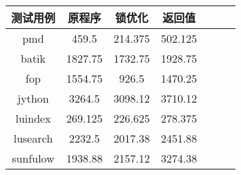 \begin{table}[htbp]
	\centering
	\begin{tabular}{c|c|c|c|c|c|c}
		\hline
		测试用例 & 原程序 & 锁优化 & 返回值 \\
		\hline
		pmd & 459.5 & 214.375 & 502.125 \\
		\hline
		batik & 1827.75 & 1732.75 & 1928.75 \\
		\hline
		fop & 1554.75 & 926.5 & 1470.25 \\
		\hline
		jython & 3264.5 & 3098.12 & 3710.12 \\
		\hline
		luindex & 269.125 & 226.625 & 278.375 \\
		\hline
		lusearch & 2232.5 & 2017.38 & 2451.88 \\
		\hline
		sunfulow & 1938.88 & 2157.12 & 3274.38 \\
		\hline
	\end{tabular}
\end{table}
